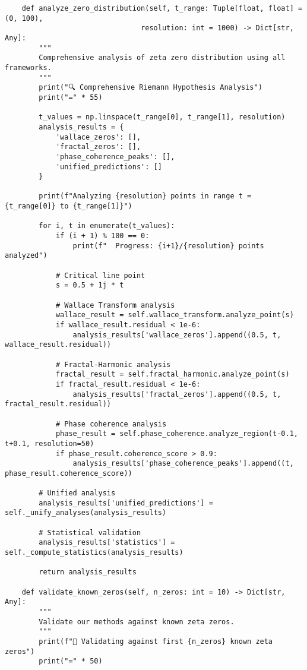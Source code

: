\documentclass[12pt]{article}
\begin{document}
\begin{lstlisting}
    def analyze_zero_distribution(self, t_range: Tuple[float, float] = (0, 100),
                                resolution: int = 1000) -> Dict[str, Any]:
        """
        Comprehensive analysis of zeta zero distribution using all frameworks.
        """
        print("🔍 Comprehensive Riemann Hypothesis Analysis")
        print("=" * 55)

        t_values = np.linspace(t_range[0], t_range[1], resolution)
        analysis_results = {
            'wallace_zeros': [],
            'fractal_zeros': [],
            'phase_coherence_peaks': [],
            'unified_predictions': []
        }

        print(f"Analyzing {resolution} points in range t = {t_range[0]} to {t_range[1]}")

        for i, t in enumerate(t_values):
            if (i + 1) % 100 == 0:
                print(f"  Progress: {i+1}/{resolution} points analyzed")

            # Critical line point
            s = 0.5 + 1j * t

            # Wallace Transform analysis
            wallace_result = self.wallace_transform.analyze_point(s)
            if wallace_result.residual < 1e-6:
                analysis_results['wallace_zeros'].append((0.5, t, wallace_result.residual))

            # Fractal-Harmonic analysis
            fractal_result = self.fractal_harmonic.analyze_point(s)
            if fractal_result.residual < 1e-6:
                analysis_results['fractal_zeros'].append((0.5, t, fractal_result.residual))

            # Phase coherence analysis
            phase_result = self.phase_coherence.analyze_region(t-0.1, t+0.1, resolution=50)
            if phase_result.coherence_score > 0.9:
                analysis_results['phase_coherence_peaks'].append((t, phase_result.coherence_score))

        # Unified analysis
        analysis_results['unified_predictions'] = self._unify_analyses(analysis_results)

        # Statistical validation
        analysis_results['statistics'] = self._compute_statistics(analysis_results)

        return analysis_results

    def validate_known_zeros(self, n_zeros: int = 10) -> Dict[str, Any]:
        """
        Validate our methods against known zeta zeros.
        """
        print(f"🔬 Validating against first {n_zeros} known zeta zeros")
        print("=" * 50)


\end{lstlisting}
\end{document}

